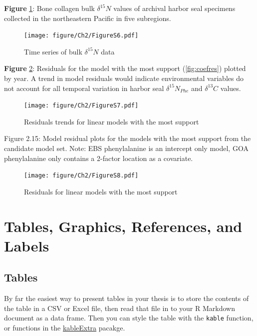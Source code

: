 \documentclass [11pt, proquest] {uwthesis}[2015/03/03]
\begin{document}
\textbf{Figure} \ref{fig:bulkN}: Bone collagen bulk \(\delta^{15}N\) values of archival harbor seal specimens collected in the
northeastern Pacific in five subregions.
\newline 
\begin{figure}[h]
\centering
  \texttt{[image: figure/Ch2/FigureS6.pdf]}
  \caption{Time series of bulk $\delta^{15}N$ data}
  \label{fig:bulkN}
\end{figure}
\clearpage

\textbf{Figure} \ref{fig:linresid}: Residuals for the model with the most support (\ref{fig:coefres}) plotted by year. A trend in model residuals would indicate environmental variables do not account for all temporal variation in harbor seal \(\delta^{15}N_{Phe}\) and \(\delta^{13}C\) values.
\newline 
\begin{figure}[h]
\centering
  \texttt{[image: figure/Ch2/FigureS7.pdf]}
  \caption{Residuals trends for linear models with the most support}
  \label{fig:linresid}
\end{figure}
\clearpage

Figure 2.15: Model residual plots for the models with the most support from the candidate model set. Note: EBS phenylalanine is an intercept only model, GOA phenylalanine only contains a 2-factor location as a covariate.
\newline 
\begin{figure}[h]
\centering
  \texttt{[image: figure/Ch2/FigureS8.pdf]}
  \caption{Residuals for linear models with the most support}
  \label{fig:linresid2}
\end{figure}
\hypertarget{ref-labels}{%
\chapter{Tables, Graphics, References, and Labels}\label{ref-labels}}

\hypertarget{tables}{%
\section{Tables}\label{tables}}

By far the easiest way to present tables in your thesis is to store the contents of the table in a CSV or Excel file, then read that file in to your R Markdown document as a data frame. Then you can style the table with the \texttt{kable} function, or functions in the \href{https://cran.r-project.org/web/packages/kableExtra/index.html}{kableExtra} pacakge.
\end{document}
